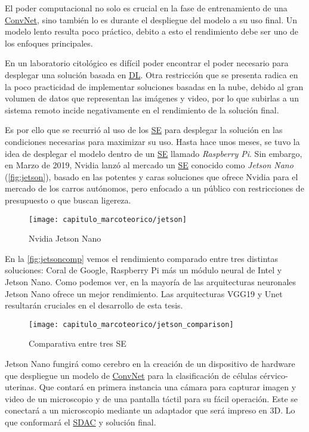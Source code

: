 El poder computacional no solo es crucial en la fase de entrenamiento de una
\hyperlink{abbr}{ConvNet}, sino también lo es durante el despliegue del modelo a
su uso final. Un modelo lento resulta poco práctico, debito a esto el
rendimiento debe ser uno de los enfoques principales.

En un laboratorio citológico es difícil poder encontrar el poder necesario para
desplegar una solución basada en \hyperlink{abbr}{DL}. Otra restricción que se
presenta radica en la poco practicidad de implementar soluciones basadas en la
nube, debido al gran volumen de datos que representan las imágenes y video, por
lo que subirlas a un sistema remoto incide negativamente en el rendimiento de la
solución final. 

Es por ello que se recurrió al uso de los \hyperlink{abbr}{SE} para desplegar la
solución en las condiciones necesarias para maximizar su uso. Hasta hace unos
meses, se tuvo la idea de desplegar el modelo dentro de un \hyperlink{abbr}{SE}
llamado \emph{Raspberry Pi}. Sin embargo, en Marzo de 2019, Nvidia lanzó al
mercado un \hyperlink{abbr}{SE} conocido como \emph{Jetson Nano}
(\autoref{fig:jetson}), basado en las potentes y caras soluciones que ofrece
Nvidia para el mercado de los carros autónomos, pero enfocado a un público con
restricciones de presupuesto o que buscan ligereza.

\begin{figure}[H]
    \centering
    \texttt{[image: capitulo\_marcoteorico/jetson]}
    \caption{Nvidia Jetson Nano}\label{fig:jetson}
\end{figure}

En la \autoref{fig:jetsoncomp} vemos el rendimiento comparado entre tres
distintas soluciones: Coral de Google, Raspberry Pi más un módulo neural de
Intel y Jetson Nano. Como podemos ver, en la mayoría de las arquitecturas
neuronales Jetson Nano ofrece un mejor rendimiento. Las arquitecturas VGG19 y
Unet resultarán cruciales en el desarrollo de esta tesis. 

\begin{figure}[H]
    \centering
    \texttt{[image: capitulo\_marcoteorico/jetson\_comparison]}
    \caption{Comparativa entre tres SE}\label{fig:jetsoncomp}
\end{figure}

Jetson Nano fungirá como cerebro en la creación de un dispositivo de hardware
que despliegue un modelo de \hyperlink{abbr}{ConvNet} para la clasificación de
células cérvico-uterinas. Que contará en primera instancia una cámara para
capturar imagen y video de un microscopio y de una pantalla táctil para su fácil
operación. Este se conectará a un microscopio mediante un adaptador que será
impreso en 3D. Lo que conformará el \hyperlink{abbr}{SDAC} y solución final.

